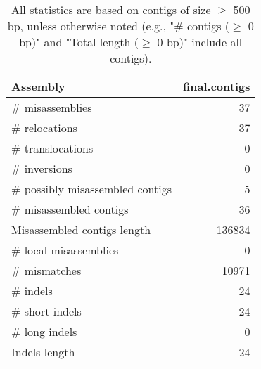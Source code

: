 \documentclass[12pt,a4paper]{article}
\begin{document}
\begin{table}[ht]
\begin{center}
\caption{All statistics are based on contigs of size $\geq$ 500 bp, unless otherwise noted (e.g., "\# contigs ($\geq$ 0 bp)" and "Total length ($\geq$ 0 bp)" include all contigs).}
\begin{tabular}{|l*{1}{|r}|}
\hline
Assembly & final.contigs \\ \hline
\# misassemblies & 37 \\ \hline
\hspace{5mm}\# relocations & 37 \\ \hline
\hspace{5mm}\# translocations & 0 \\ \hline
\hspace{5mm}\# inversions & 0 \\ \hline
\# possibly misassembled contigs & 5 \\ \hline
\# misassembled contigs & 36 \\ \hline
Misassembled contigs length & 136834 \\ \hline
\# local misassemblies & 0 \\ \hline
\# mismatches & 10971 \\ \hline
\# indels & 24 \\ \hline
\hspace{5mm}\# short indels & 24 \\ \hline
\hspace{5mm}\# long indels & 0 \\ \hline
Indels length & 24 \\ \hline
\end{tabular}
\end{center}
\end{table}
\end{document}
